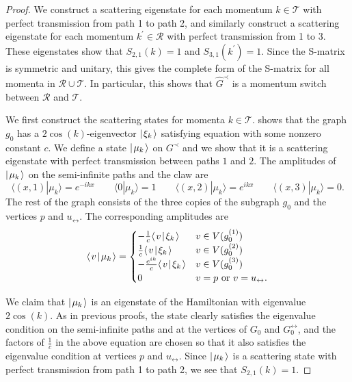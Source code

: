 \documentclass[../thesis-main/thesis-main]{subfiles}
\begin{document}
\begin{proof}

We construct a scattering eigenstate for each momentum $k\in \mathcal{T}$ with perfect transmission from path 1 to path 2, and similarly construct a scattering eigenstate for each momentum $k^{\prime}\in \mathcal{R}$ with perfect transmission from 1 to 3.  These eigenstates show that $S_{2,1}(k) = 1$ and $S_{3,1}(k^\prime) = 1$. Since the S-matrix is symmetric and unitary, this gives the complete form of the S-matrix for all momenta in $\mathcal{R}\cup\mathcal{T}$.  In particular, this shows that $\hat{G}^{\prec}$ is a momentum switch between $\mathcal{R}$ and $\mathcal{T}$.

We first construct the scattering states for momenta $k\in \mathcal{T}$.   shows that the graph $g_0$ has a $2\cos(k)$-eigenvector $|\mspace{2mu} \xi_k \mspace{2mu} \rangle$ satisfying equation  with some nonzero constant $c$. We define a state $|\mspace{2mu} \mu_k \mspace{2mu} \rangle$ on $G^{\prec}$ and we show that it is a scattering eigenstate with perfect transmission between paths $1$ and $2$.   The amplitudes of $|\mspace{2mu} \mu_k \mspace{2mu} \rangle$ on the semi-infinite paths and the claw are
\[
  \langle (x,1)|\mu_k\rangle=e^{-ikx} \qquad 
  \langle 0|\mu_k\rangle=1 \qquad 
  \langle (x,2)|\mu_k\rangle=e^{ikx} \qquad
  \langle (x,3)|\mu_k\rangle=0.
\]
The rest of the graph consists of the three copies of the subgraph $g_0$ and the vertices $p$ and $u_{\leftrightarrow}$. The corresponding amplitudes are
\[
  \langle\mspace{2mu} v \mspace{2mu} | \mspace{2mu} \mu_k\mspace{2mu} \rangle =
  \begin{cases}
	  -\frac{1}{c}\langle\mspace{2mu} v \mspace{2mu} | \mspace{2mu} \xi_k\mspace{2mu} \rangle & v\in V(g^{(1)}_0) \\
    \frac{1}{c}\langle\mspace{2mu} v \mspace{2mu} | \mspace{2mu} \xi_k\mspace{2mu} \rangle & v \in V(g^{(2)}_0) \\
	  -\frac{e^{ik}}{c} \langle\mspace{2mu} v \mspace{2mu} | \mspace{2mu} \xi_k\mspace{2mu} \rangle & v \in V(g^{(3)}_0) \\
  	0 & v=p \text{ or } v=u_{\leftrightarrow}.
  \end{cases}
\]

We claim that $|\mspace{2mu} \mu_k \mspace{2mu} \rangle$ is an eigenstate of the Hamiltonian with eigenvalue $2\cos(k)$.  As in previous proofs, the state clearly satisfies the eigenvalue condition on the semi-infinite paths and at the vertices of $G_0$ and $G_0^\leftrightarrow$, and the factors of $\frac{1}{c}$ in the above equation are chosen so that it also satisfies the eigenvalue condition at vertices $p$ and $u_\leftrightarrow$. Since $|\mspace{2mu} \mu_k \mspace{2mu} \rangle$ is a scattering state with perfect transmission from path 1 to path 2, we see that $S_{2,1}(k) = 1$.


\end{proof}
\end{document}
